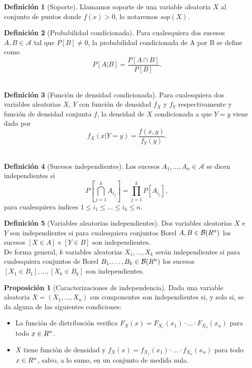 \documentclass[12pt,a4paper]{report} %
\let\mathbb\relax
\theoremstyle{definition}
\newtheorem{definition}{Definición}[section]
\newtheorem{proposition}[theorem]{Proposición}
\begin{document}
\begin{definition}[Soporte]
Llamamos soporte de una variable aleatoria $X$ al conjunto de puntos donde $f(x)>0$, lo notaremos $sop(X)$.\\
\end{definition}


\begin{definition}[Probabilidad condicionada]
  Para cualesquiera dos sucesos $A,B \in \mathcal{A}$ tal que $P[B]\neq 0$, la probabilidad condicionada de A por B se define como\[
P[A|B] = \frac{P[A\cap B]}{P[B]}.
  \]\\[-10pt]
\end{definition}

\begin{definition}[Función de densidad condicionada]
  Para cualesquiera dos variables aleatorias $X$, $Y$ con función de densidad $f_X$ y $f_Y$ respectivamente y función de densidad conjunta $f$, la densidad de $X$ condicionada a que $Y=y$ viene dada por\[
f_X(x|Y=y) = \frac{f(x,y)}{f_Y(y)}.
  \]\\[-10pt]
\end{definition}

\begin{definition}[Sucesos independientes]
  Los sucesos $A_1,\dots,A_n\in \mathcal{A}$ se dicen independientes si\[
P\left [\bigcap_{j=1}^kA_{i_j} \right ] = \prod_{j=1}^kP\left [A_{i_j} \right],
\]
para cualesquiera índices $1\leq i_1\leq \dots \leq i_k\leq n$.\\
\end{definition}

\begin{definition}[Variables aleatorias independientes]
  Dos variables aleatorias $X$ e $Y$ son independientes si para cualesquiera conjuntos Borel $A, B \in \mathcal{B}(\mathbb{R}^n)$ los sucesos $[X\in A]$ e $[Y\in B]$ son independientes.\\

De forma general, $k$ variables aleatorias $X_1,\dots,X_k$ serán independientes si para cualesquiera conjuntos de Borel $B_1,\dots,B_k \in \mathcal{B}(\mathbb{R}^n)$ los sucesos $[X_1 \in B_1],\dots,[X_k\in B_k]$ son independientes.\\
\end{definition}

\begin{proposition}[Caracterizaciones de independencia]
  Dada una variable aleatoria $X =(X_1,\dots,X_n)$ sus componentes son independientes si, y solo si, se da alguna de las siguientes condiciones:
  \begin{itemize}
  \item La función de distribución verifica $F_X(x) = F_{X_1}(x_1)\cdot \ldots\cdot F_{X_n}(x_n)$ para todo $x \in \mathbb{R}^n$.
  \item $X$ tiene función de densidad y $f_X(x) = f_{X_1}(x_1)\cdot \ldots\cdot f_{X_n}(x_n)$ para todo $x \in \mathbb{R}^n$, salvo, a lo sumo, en un conjunto de medida nula.\\
  \end{itemize}
\end{proposition}
\end{document}
